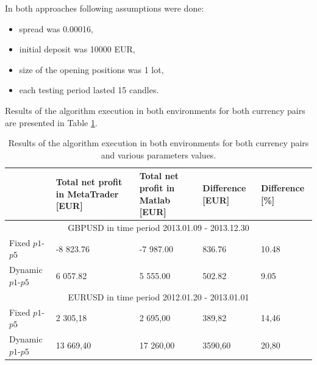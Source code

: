 \documentclass[runningheads,a4paper]{llncs}
\begin{document}
\begin{enumerate}
\begin{itemize}
\end{itemize}
In both approaches following assumptions were done:
\begin{itemize}
\item spread was 0.00016, 
\item initial deposit was 10000 EUR,
\item size of the opening positions was 1 lot,
\item each testing period lasted 15 candles.
\end{itemize}
\end{enumerate}


Results of the algorithm execution in both environments for both currency pairs are presented in Table \ref{tab:tab5}.
\begin{table}[h!]
\centering
\caption{Results of the algorithm execution in both environments for both currency pairs and various parameters values.}
\label{tab:tab5}
\begin{tabular}{|p{}|p{}|p{}|p{}|p{}|} \hline
 &  Total net profit in MetaTrader [EUR]	 &  Total net profit in Matlab 
[EUR]	 &  Difference [EUR]	 &  Difference [\%]\\ \hline
\multicolumn{5}{|c|}{GBPUSD in time period 2013.01.09 - 2013.12.30}\\ \hline
Fixed $p1$-$p5$	 & -8 823.76 & 	-7 987.00 & 	836.76 & 	10.48\\
Dynamic $p1$-$p5$	 & 6 057.82	 & 5 555.00	 & 502.82 & 	9.05\\ \hline
\multicolumn{5}{|c|}{EURUSD in time period 2012.01.20 - 2013.01.01}\\ \hline
Fixed $p1$-$p5$	 & 2 305,18 & 	2 695,00	 & 389,82	 & 14,46\\
Dynamic $p1$-$p5$ & 	13 669,40 & 	17 260,00 & 	3590,60	 & 20,80\\ \hline
\end{tabular}
\end{table}
\FloatBarrier
\end{document}
